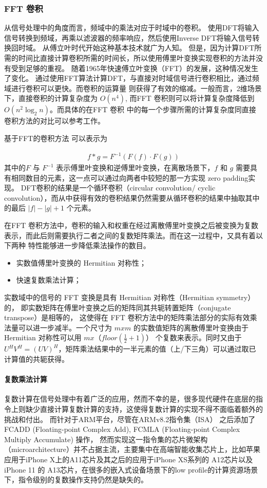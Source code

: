 \subsubsection{FFT 卷积}
从信号处理中的角度而言，频域中的乘法对应于时域中的卷积。 使用DFT将输入信号转换到频域，再乘以滤波器的频率响应，然后使用Inverse DFT将输入信号转换回时域。
从傅立叶时代开始这种基本技术就广为人知。 但是，因为计算DFT所需的时间比直接计算卷积所需的时间长，所以使用傅里叶变换实现卷积的方法并没有受到足够的重视。
随着1965年快速傅立叶变换（FFT）的发展，这种情况发生了变化。 通过使用FFT算法计算DFT，与直接对时域信号进行卷积相比，通过频域进行卷积可以更快。而卷积的运算量
则获得了有效的缩减。一般而言，2维场景下，直接卷积的计算复杂度为 $O(n^4)$, 而FFT 卷积则可以将计算复杂度降低到 $O(n^2 \log_{2}n)$。而具体的在FFT 卷积
中的每一个步骤所需的计算复杂度同直接卷积方法的对比可以参考工作\cite{Mathieu2013FastTO}。

基于FFT的卷积方法\cite{Zlateski2018FFTCA} \cite{Mathieu2013FastTO}可以表示为

\begin{align}
  f * g = F^{-1}(F(f)  \cdot F(g))
\end{align}
其中的$F$ 与 $F^{-1}$ 表示傅里叶变换和逆傅里叶变换，在离散场景下，$f$ 和 $g$ 需要具有相同数目的元素，这一点可以通过向两者中较短的那一方实现 zero padding实现。
DFT卷积的结果是一个循环卷积（circular convolution/ cyclic convolution），而从中获得有效的卷积结果仍然需要从循环卷积的结果中抽取其中的最后 $|f| - |g| + 1 $
个元素。

在FFT 卷积方法中，卷积的输入和权重在经过离散傅里叶变换之后被变换为复数表示，而此后则需要执行二者之间的复数矩阵乘法。而在这一过程中，又具有着以下两种
特性能够进一步降低乘法操作的数目。

\begin{itemize}
  \item 实数值傅里叶变换的 Hermitian 对称性；
  \item 快速复数乘法计算；
\end{itemize}

实数域中的信号的 FFT 变换是具有 Hermitian 对称性（Hermitian symmetry）的， 即实数矩阵在傅里叶变换之后的矩阵同其共轭转置矩阵（conjugate transpose）是相等的，
这使得在 FFT 卷积方法中的矩阵乘法部分的实际有效乘法量可以进一步减半。一个尺寸为 $m x m$ 的实数值矩阵的离散傅里叶变换由于 Hermitian 对称性可以用 $ m x （floor(\frac{1}{2} + 1)） $ 
个复数来表示。同时又由于 $ U^H V^H = ( UV )^H $，矩阵乘法结果中的一半元素的值（上/下三角）可以通过取已计算值的共轭获得。

\paragraph{复数乘法计算}
复数计算在信号处理中有着广泛的应用，然而不幸的是，很多现代硬件在底层的指令上则缺少直接计算复数计算的支持，这使得复数计算的实现不得不面临着额外的挑战和付出。
而针对于ARM平台，尽管在ARMv8.2指令集（ISA） 之后添加了 FCADD (Floating-point Complex Add), FCMLA (Floating-point Complex Multiply Accumulate) 操作，
然而实现这一指令集的芯片微架构（microarchitecture）并不占据主流，主要集中在高端智能收集芯片上，比如苹果应用于iPhone X上的A11芯片及其之后的应用于iPhone XS系列的
A12芯片以及iPhone 11 的 A13芯片，在很多的嵌入式设备场景下的low profile的计算资源场景下，指令级别的复数操作支持仍然是缺失的。

